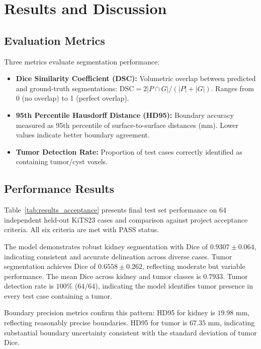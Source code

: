 \section{Results and Discussion}

\subsection{Evaluation Metrics}

Three metrics evaluate segmentation performance:

\begin{itemize}
    \item \textbf{Dice Similarity Coefficient (DSC):} Volumetric overlap between predicted and ground-truth segmentations: $\text{DSC} = 2|P \cap G| / (|P| + |G|)$. Ranges from 0 (no overlap) to 1 (perfect overlap).
    \item \textbf{95th Percentile Hausdorff Distance (HD95):} Boundary accuracy measured as 95th percentile of surface-to-surface distances (mm). Lower values indicate better boundary agreement.
    \item \textbf{Tumor Detection Rate:} Proportion of test cases correctly identified as containing tumor/cyst voxels.
\end{itemize}

\subsection{Performance Results}



Table~\ref{tab:results_acceptance} presents final test set performance on 64 independent held-out KiTS23 cases and comparison against project acceptance criteria. All six criteria are met with PASS status.

The model demonstrates robust kidney segmentation with Dice of $0.9307 \pm 0.064$, indicating consistent and accurate delineation across diverse cases. Tumor segmentation achieves Dice of $0.6558 \pm 0.262$, reflecting moderate but variable performance. The mean Dice across kidney and tumor classes is $0.7933$. Tumor detection rate is $100\%$ ($64/64$), indicating the model identifies tumor presence in every test case containing a tumor.

Boundary precision metrics confirm this pattern: HD95 for kidney is $19.98$ mm, reflecting reasonably precise boundaries. HD95 for tumor is $67.35$ mm, indicating substantial boundary uncertainty consistent with the standard deviation of tumor Dice.

